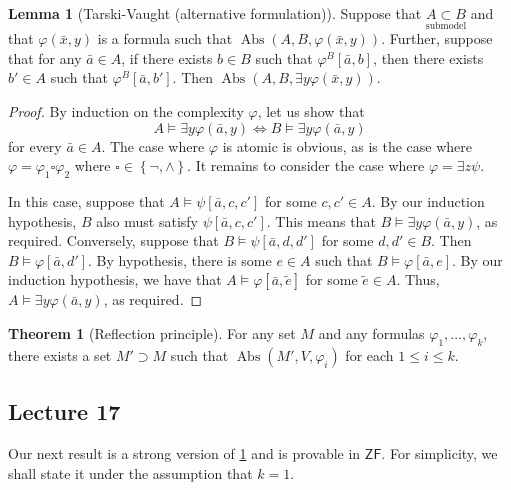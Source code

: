 \documentclass[10pt,letterpaper,cm]{nupset}
\theoremstyle{definition}
\theoremstyle{theorem}
\newtheorem{theorem}[definition]{Theorem}
\newtheorem{lemma}[definition]{Lemma}
\theoremstyle{remark}
\newcommand{\1}{\mathbf{1}}
\newcommand{\0}{\vec 0}
\newcommand{\zf}{\mathsf{ZF}}
\DeclareMathOperator{\abs}{Abs}
\begin{document}
\begin{lemma}[Tarski-Vaught (alternative formulation)]
Suppose that $\underset{\text{submodel}}{A \subset B}$ and that $\varphi(\bar{x}, y)$ is a formula such that $\abs(A, B, \varphi(\bar{x}, y))$. Further, suppose that for any $\bar{a} \in A$, if there exists $b\in B$ such that $\varphi^B[\bar{a}, b]$, then there exists $b' \in A$ such that $\varphi^B[\bar{a}, b']$. Then $\abs(A, B, \exists{y}\varphi(\bar{x}, y))$.
\end{lemma}
\begin{proof}
By induction on the complexity $\varphi$, let us show that $$A\models \exists{y}\varphi(\bar{a}, y) \iff B\models \exists{y}\varphi(\bar{a}, y) $$ for every $\bar{a}\in A$.  The case where $\varphi$ is atomic is obvious, as is the case where $\varphi   = \varphi_1 \square \varphi_2$ where $\square \in \left\{\neg, \land\right\}$. It remains to consider the case where $\varphi = \exists{z}\psi$. 

\smallskip

In this case, suppose that $A \models \psi\left[\bar{a},c, c'\right]$ for some $c,c'\in A$. By our induction hypothesis, $B$ also must satisfy  $\psi\left[\bar{a},c, c'\right]$. This means that $B\models \exists{y}\varphi(\bar{a},y)$, as required.
Conversely, suppose that $B\models \psi\left[\bar{a}, d, d'\right]$ for some $d,d'\in B$. Then $B\models \varphi\left[\bar{a}, d'\right]$. By hypothesis, there is some $e\in A$ such that $B \models \varphi\left[\bar{a}, e\right]$. By our induction hypothesis, we have that $A \models \varphi\left[\bar{a}, \tilde{e}\right]$ for some $\tilde{e}\in A$. Thus, $A\models \exists{y}\varphi(\bar{a},y)$, as required.

\end{proof}

\begin{theorem}[Reflection principle]\label{RP}
For any set $M$ and any formulas $\varphi_1, \ldots, \varphi_k$, there exists a set $M' \supset M$ such that $\abs(M', V, \varphi_i)$ for each $1\leq i \leq k$.
\end{theorem}

\subsection{Lecture 17}

Our next result is a strong version of \cref{RP} and is provable in $\zf$. For simplicity, we shall state it under the assumption that $k=1$.
\end{document}
